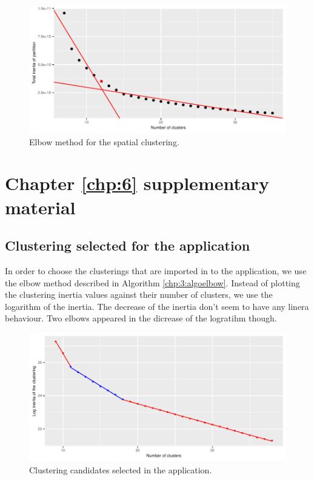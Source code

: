 \begin{appendices}
\begin{figure}[H]
  \centering
  \includegraphics[]{figs/Chap5/Elb_clust.pdf}
  \caption{Elbow method for the spatial clustering.}
  \label{fig:elb:clust}
\end{figure}

\chapter{Chapter \ref{chp:6} supplementary material} \label{app:chap6}

\section{Clustering selected for the application}\label{app:chap6:1}

In order to choose the clusterings that are imported in to the application, we use the elbow method described in Algorithm \ref{chp:3:algoelbow}. Instead of plotting the clustering inertia values against their number of clusters, we use the logarithm of the inertia. The decrease of the inertia don't seem to have any linera behaviour. Two elbows appeared in the dicrease of the logratihm though.  

\begin{figure}[H]
  \centering
  \includegraphics[]{figs/App/NB_CLUST.pdf}
  \caption{Clustering candidates selected in the application.}
  \label{fig:elb:clust2}
\end{figure}


\end{appendices}
